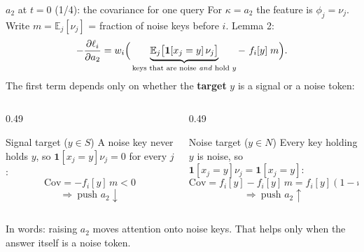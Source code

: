 \documentclass[aspectratio=169,11pt]{beamer}
\newcommand{\1}{\mathbf{1}}
\begin{document}
\begin{frame}{$a_2$ at $t=0$ (1/4): the covariance for one query}
\small
For $\kappa=a_2$ the feature is $\phi_j=\nu_j$. Write $m=\mathbb E_j[\nu_j]$ = fraction of noise keys before $i$. Lemma 2:
\[
-\frac{\partial\ell_i}{\partial a_2}=w_i\Big(\underbrace{\mathbb E_j\big[\1[x_j=y]\,\nu_j\big]}_{\text{keys that are noise \emph{and} hold }y}-\ f_i[y]\;m\Big).
\]
The first term depends only on whether the \textbf{target} $y$ is a signal or a noise token:
\begin{columns}[T]
\begin{column}{0.49\textwidth}
\begin{block}{Signal target ($y\in S$)}
A noise key never holds $y$, so $\1[x_j=y]\nu_j=0$ for every $j$:
\[
\mathrm{Cov}=-f_i[y]\,m<0
\]
\[
\Rightarrow\ \text{push }a_2\downarrow
\]
\end{block}
\end{column}
\begin{column}{0.49\textwidth}
\begin{block}{Noise target ($y\in N$)}
Every key holding $y$ is noise, so $\1[x_j=y]\nu_j=\1[x_j=y]$:
\[
\mathrm{Cov}=f_i[y]-f_i[y]\,m=f_i[y](1-m)>0
\]
\[
\Rightarrow\ \text{push }a_2\uparrow
\]
\end{block}
\end{column}
\end{columns}
\vspace{0.3em}
In words: raising $a_2$ moves attention onto noise keys. That helps only when the answer itself is a noise token.
\end{frame}
\end{document}
